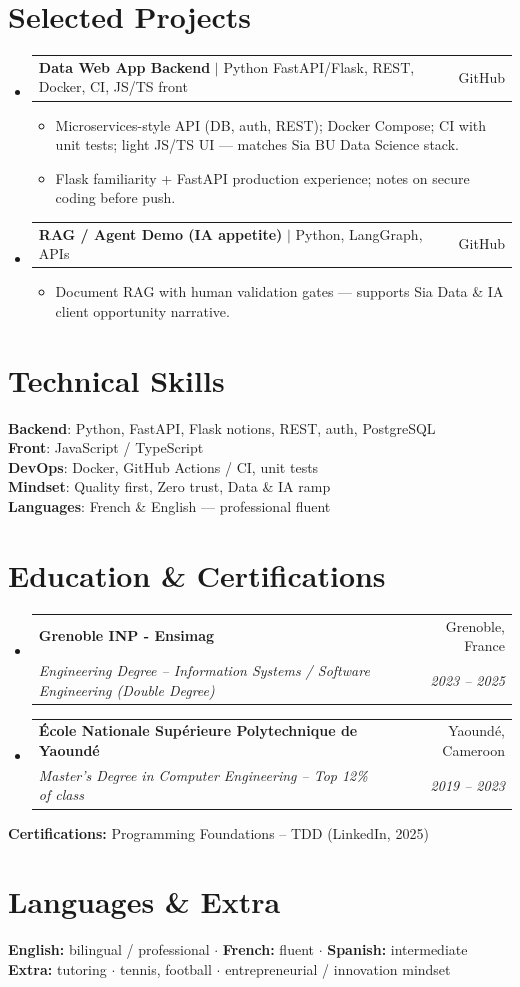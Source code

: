 \documentclass[letterpaper,10.5pt]{article}
\makeatletter
\newcommand{\resumeItem}[1]{\item\small{#1 \vspace{-1.5pt}}}
\newcommand{\resumeSubheading}[4]{\vspace{-1pt}\item\begin{tabular*}{0.97\textwidth}[t]{l@{\extracolsep{\fill}}r}\textbf{#1} & #2 \\\textit{\small#3} & \textit{\small #4} \\\end{tabular*}\vspace{-5pt}}
\newcommand{\resumeProjectHeading}[2]{\item\begin{tabular*}{0.97\textwidth}{l@{\extracolsep{\fill}}r}\small#1 & #2 \\\end{tabular*}\vspace{-5pt}}
\newcommand{\resumeSubHeadingListStart}{\begin{itemize}[leftmargin=0.15in, label={}]}
\newcommand{\resumeSubHeadingListEnd}{\end{itemize}}
\newcommand{\resumeItemListStart}{\begin{itemize}[leftmargin=0.18in]}
\newcommand{\resumeItemListEnd}{\end{itemize}\vspace{-3pt}}
\makeatother
\begin{document}
\section{Selected Projects}
\resumeSubHeadingListStart
  \resumeProjectHeading{\textbf{Data Web App Backend} $|$ Python FastAPI/Flask, REST, Docker, CI, JS/TS front}{GitHub}
    \resumeItemListStart
      \resumeItem{Microservices-style API (DB, auth, REST); Docker Compose; CI with unit tests; light JS/TS UI --- matches Sia BU Data Science stack.}
      \resumeItem{Flask familiarity + FastAPI production experience; notes on secure coding before push.}
    \resumeItemListEnd
  \resumeProjectHeading{\textbf{RAG / Agent Demo (IA appetite)} $|$ Python, LangGraph, APIs}{GitHub}
    \resumeItemListStart
      \resumeItem{Document RAG with human validation gates --- supports Sia Data \& IA client opportunity narrative.}
    \resumeItemListEnd
\resumeSubHeadingListEnd
\section{Technical Skills}
\begin{itemize}[leftmargin=0.15in, label={}]\small{\item{\textbf{Backend}: Python, FastAPI, Flask notions, REST, auth, PostgreSQL \\ \textbf{Front}: JavaScript / TypeScript \\ \textbf{DevOps}: Docker, GitHub Actions / CI, unit tests \\ \textbf{Mindset}: Quality first, Zero trust, Data \& IA ramp \\ \textbf{Languages}: French \& English --- professional fluent}}\end{itemize}
\section{Education \& Certifications}
\resumeSubHeadingListStart
  \resumeSubheading{Grenoble INP - Ensimag}{Grenoble, France}{Engineering Degree -- Information Systems / Software Engineering (Double Degree)}{2023 -- 2025}
  \resumeSubheading{\'Ecole Nationale Sup\'erieure Polytechnique de Yaound\'e}{Yaound\'e, Cameroon}{Master's Degree in Computer Engineering -- Top 12\% of class}{2019 -- 2023}
\resumeSubHeadingListEnd
\small{\textbf{Certifications:} Programming Foundations -- TDD (LinkedIn, 2025)}
\section{Languages \& Extra}
\small{\textbf{English:} bilingual / professional $\cdot$ \textbf{French:} fluent $\cdot$ \textbf{Spanish:} intermediate \\ \textbf{Extra:} tutoring $\cdot$ tennis, football $\cdot$ entrepreneurial / innovation mindset}
\end{document}

